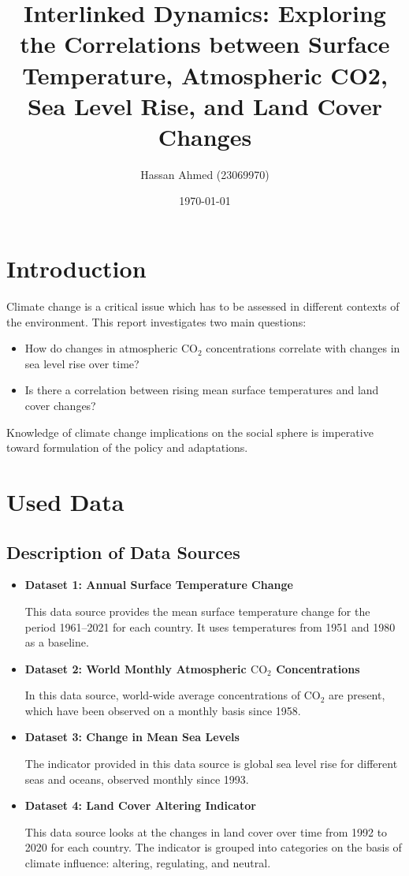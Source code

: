 \documentclass[a4paper,11pt]{article}
\title{Interlinked Dynamics: Exploring the Correlations between Surface Temperature, Atmospheric CO2, Sea Level Rise, and Land Cover Changes}
\author{Hassan Ahmed (23069970)}
\date{\today}
\begin{document}
\maketitle

\section{Introduction}
Climate change is a critical issue which has to be assessed in different contexts of the environment.
This report investigates two main questions:
\begin{itemize}
    \item How do changes in atmospheric \(\text{CO}_2\) concentrations correlate with changes in sea level rise over time?
    \item Is there a correlation between rising mean surface temperatures and land cover changes?
\end{itemize}
Knowledge of climate change implications on the social sphere is imperative toward formulation of the policy and adaptations.

\section{Used Data}
\subsection{Description of Data Sources}
\begin{itemize}

\item \textbf{Dataset 1: Annual Surface Temperature Change}

This data source provides the mean surface temperature change for the period 1961–2021 for each country. It uses temperatures from 1951 and 1980 as a baseline. \cite{dataset1}

\item \textbf{Dataset 2: World Monthly Atmospheric \(\text{CO}_2\) Concentrations}

In this data source, world-wide average concentrations of \(\text{CO}_2\) are present, which have been observed on a monthly basis since 1958. \cite{dataset2}

\item \textbf{Dataset 3: Change in Mean Sea Levels}

The indicator provided in this data source is global sea level rise for different seas and oceans, observed monthly since 1993. \cite{dataset3}

\item \textbf{Dataset 4: Land Cover Altering Indicator}

This data source looks at the changes in land cover over time from 1992 to 2020 for each country. The indicator is grouped into categories on the basis of climate influence: altering, regulating, and neutral. \cite{dataset4}

\end{itemize}
\end{document}
